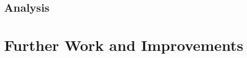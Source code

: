 
\subsection{Analysis}\label{subsec:analysis}


\section{Further Work and Improvements}\label{sec:further-work-and-improvements}

